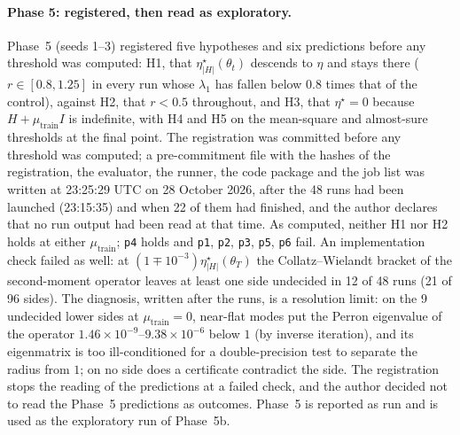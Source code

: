 \documentclass[11pt]{article}
\theoremstyle{remark}
\begin{document}
\paragraph{Phase 5: registered, then read as exploratory.} Phase~5 (seeds 1--3) registered five hypotheses and six predictions before any threshold was computed: H1, that $\eta^\star_{|H|}(\theta_t)$ descends to $\eta$ and stays there ($r\in[0.8,1.25]$ in every run whose $\lambda_1$ has fallen below $0.8$ times that of the control), against H2, that $r<0.5$ throughout, and H3, that $\eta^\star=0$ because $H+\mu_{\mathrm{train}}I$ is indefinite, with H4 and H5 on the mean-square and almost-sure thresholds at the final point. The registration was committed before any threshold was computed; a pre-commitment file with the hashes of the registration, the evaluator, the runner, the code package and the job list was written at 23:25:29 UTC on 28 October 2026, after the 48 runs had been launched (23:15:35) and when 22 of them had finished, and the author declares that no run output had been read at that time. As computed, neither H1 nor H2 holds at either $\mu_{\mathrm{train}}$; \texttt{p4} holds and \texttt{p1}, \texttt{p2}, \texttt{p3}, \texttt{p5}, \texttt{p6} fail. An implementation check failed as well: at $(1\mp10^{-3})\eta^\star_{|H|}(\theta_T)$ the Collatz--Wielandt bracket of the second-moment operator leaves at least one side undecided in 12 of 48 runs (21 of 96 sides). The diagnosis, written after the runs, is a resolution limit: on the 9 undecided lower sides at $\mu_{\mathrm{train}}=0$, near-flat modes put the Perron eigenvalue of the operator $1.46\times10^{-9}$--$9.38\times10^{-6}$ below $1$ (by inverse iteration), and its eigenmatrix is too ill-conditioned for a double-precision test to separate the radius from $1$; on no side does a certificate contradict the side. The registration stops the reading of the predictions at a failed check, and the author decided not to read the Phase~5 predictions as outcomes. Phase~5 is reported as run and is used as the exploratory run of Phase~5b.
\end{document}
